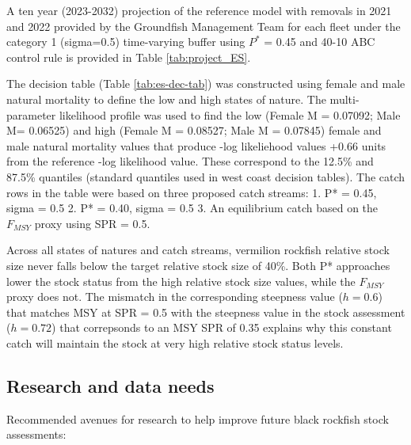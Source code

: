 \documentclass[11pt,
  english,
  letterpaper,
]{article}
\begin{document}
A ten year (2023-2032) projection of the reference model with removals in 2021 and 2022 provided by the Groundfish Management Team for each fleet under the category 1 (sigma=0.5) time-varying buffer using \(P^*\) = 0.45 and 40-10 ABC control rule is provided in Table \ref{tab:project_ES}.



The decision table (Table \ref{tab:es-dec-tab}) was constructed using female and male natural mortality to define the low and high states of nature. The multi-parameter likelihood profile was used to find the low (Female M = 0.07092; Male M= 0.06525) and high (Female M = 0.08527; Male M = 0.07845) female and male natural mortality values that produce -log likeliehood values +0.66 units from the reference -log likelihood value. These correspond to the 12.5\% and 87.5\% quantiles (standard quantiles used in west coast decision tables). The catch rows in the table were based on three proposed catch streams: 1. P* = 0.45, sigma = 0.5 2. P* = 0.40, sigma = 0.5 3. An equilibrium catch based on the \(F_{MSY}\) proxy using SPR = 0.5.

Across all states of natures and catch streams, vermilion rockfish relative stock size never falls below the target relative stock size of 40\%. Both P* approaches lower the stock status from the high relative stock size values, while the \(F_{MSY}\) proxy does not. The mismatch in the corresponding steepness value (\(h=0.6\)) that matches MSY at SPR = 0.5 with the steepness value in the stock assessment (\(h=0.72\)) that correpsonds to an MSY SPR of 0.35 explains why this constant catch will maintain the stock at very high relative stock status levels.

\clearpage



\clearpage

\hypertarget{research-and-data-needs}{%
\subsection*{Research and data needs}\label{research-and-data-needs}}

Recommended avenues for research to help improve future black rockfish stock assessments:
\end{document}
